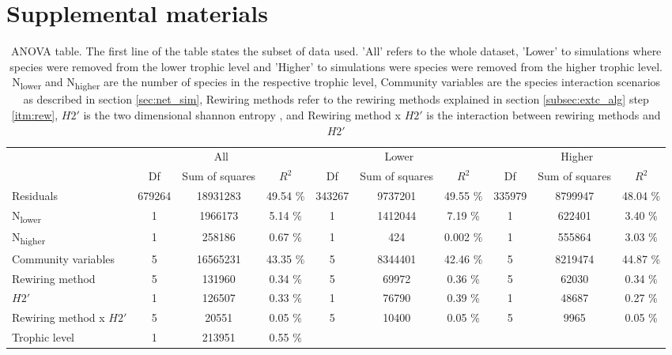 \documentclass[12pt,a4paper]{article}
\begin{document}
\section{Supplemental materials}
\begin{landscape}
\begin{table}
\label{tab:anova}
\caption{ANOVA table. The first line of the table states the subset of data used. 'All' refers to the whole dataset, 'Lower' to simulations where species were removed from the lower trophic level and 'Higher' to simulations were species were removed from the higher trophic level. N\textsubscript{lower} and N\textsubscript{higher} are the number of species in the respective trophic level, Community variables are the species interaction scenarios as described in section \ref{sec:net_sim}, Rewiring methods refer to the rewiring methods explained in section \ref{subsec:extc_alg} step \ref{itm:rew}, $H2'$ is the two dimensional shannon entropy \parencite{Blüthgen2006}, and Rewiring method x $H2'$ is the interaction between rewiring methods and $H2'$}
\begin{tabularx}{\linewidth}{@{} X *9{c} @{}}
\toprule
  & \multicolumn{3}{c}{All} & \multicolumn{3}{c}{Lower} & \multicolumn{3}{c}{Higher} \\ \cmidrule(l){2-4} \cmidrule(l){5-7} \cmidrule(l){8-10}
  & Df & Sum of squares & $R^2$ & Df & Sum of squares & $R^2$ & Df & Sum of squares & $R^2$  \\ \midrule
Residuals & 679264 & 18931283 & 49.54 \% & 343267 & 9737201 & 49.55 \% & 335979 & 8799947 & 48.04 \%\\ 
N\textsubscript{lower} & 1 & 1966173 & 5.14 \% & 1 & 1412044 & 7.19 \% & 1 & 622401 & 3.40 \%\\
N\textsubscript{higher} & 1 & 258186 & 0.67 \% & 1 & 424 & 0.002 \% & 1 & 555864 & 3.03 \%\\
Community variables & 5 & 16565231 & 43.35 \% & 5 & 8344401 & 42.46 \% & 5 & 8219474 & 44.87 \%\\
Rewiring method & 5 & 131960 & 0.34 \% & 5 & 69972 & 0.36 \% & 5 & 62030 & 0.34 \%\\ 
$H2'$ & 1 & 126507 & 0.33 \% & 1 & 76790 & 0.39 \% & 1 & 48687 & 0.27 \%\\
Rewiring method x $H2'$ & 5 & 20551 & 0.05 \% & 5 & 10400 & 0.05 \% & 5 & 9965 & 0.05 \%\\ 
Trophic level & 1 & 213951 & 0.55 \%  \\ \bottomrule
\end{tabularx}
\end{table}
\end{landscape}
\end{document}
